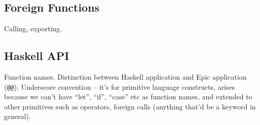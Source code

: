 \subsection{Foreign Functions}

Calling, exporting.

\subsection{Haskell API}

Function names. Distinction between Haskell application and Epic
application (\texttt{@@}). Underscore convention -- it's for primitive
language constructs, arises because we can't have ``let'', ``if'',
``case'' etc as function names, and extended to other primitives such
as operators, foreign calls (anything that'd be a keyword in general).
